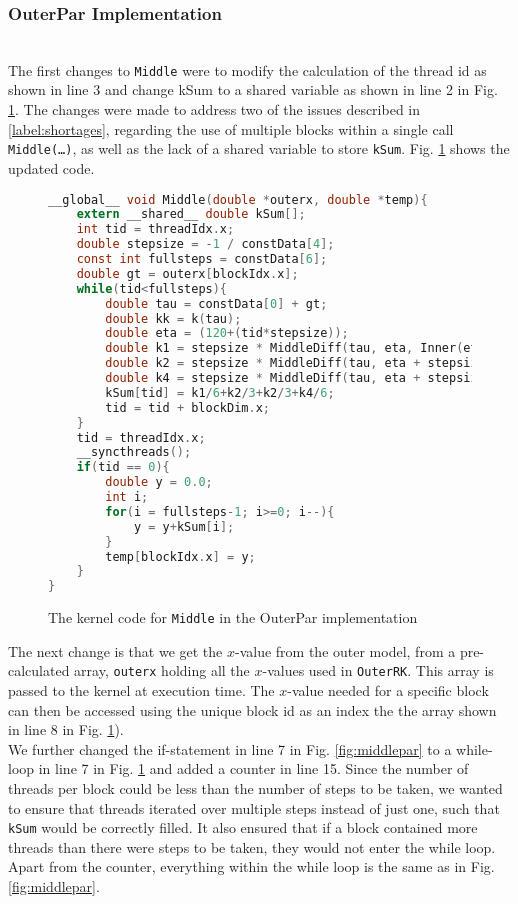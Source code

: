 \subsubsection{OuterPar Implementation} \hfill \\
The first changes to \texttt{Middle} were to modify the calculation of the thread id as shown in line 3 and change kSum to a shared variable as shown in line 2 in Fig. \ref{fig:outerpar}. The changes were made to address two of the issues described in \ref{label:shortages}, regarding the use of multiple blocks within a single call \texttt{Middle(…)}, as well as the lack of a shared variable to store \texttt{kSum}. Fig. \ref{fig:outerpar} shows the updated code.

\begin{figure}[ht]
\begin{lstlisting}[language=c]
__global__ void Middle(double *outerx, double *temp){
	extern __shared__ double kSum[];
	int tid = threadIdx.x;
	double stepsize = -1 / constData[4];
	const int fullsteps = constData[6];
	double gt = outerx[blockIdx.x];
	while(tid<fullsteps){
		double tau = constData[0] + gt;
		double kk = k(tau);
		double eta = (120+(tid*stepsize));
		double k1 = stepsize * MiddleDiff(tau, eta, Inner(eta, gt, kk).y);
		double k2 = stepsize * MiddleDiff(tau, eta + stepsize/2, Inner(eta + stepsize/2, gt, kk).y);		
		double k4 = stepsize * MiddleDiff(tau, eta + stepsize, Inner(eta + stepsize, gt, kk).y);
		kSum[tid] = k1/6+k2/3+k2/3+k4/6;
		tid = tid + blockDim.x;
	}
	tid = threadIdx.x;
	__syncthreads();
	if(tid == 0){
		double y = 0.0;
		int i;
		for(i = fullsteps-1; i>=0; i--){
			y = y+kSum[i];
		}
		temp[blockIdx.x] = y;
	}
}
\end{lstlisting}
\caption{The kernel code for \texttt{Middle} in the OuterPar implementation}
\label{fig:outerpar}
\end{figure}

The next change is that we get the $x$-value from the outer model, from a pre-calculated array, \texttt{outerx} holding all the $x$-values used in \texttt{OuterRK}. This array is passed to the kernel at execution time. The $x$-value needed for a specific block can then be accessed using the unique block id as an index the the array shown in line 8 in Fig. \ref{fig:outerpar}).\\

We further changed the if-statement in line 7 in Fig. \ref{fig:middlepar} to a while-loop in line 7 in Fig. \ref{fig:outerpar} and added a counter in line 15. Since the number of threads per block could be less than the number of steps to be taken, we wanted to ensure that threads iterated over multiple steps instead of just one, such that \texttt{kSum} would be correctly filled. It also ensured that if a block contained more threads than there were steps to be taken, they would not enter the while loop. Apart from the counter, everything within the while loop is the same as in Fig. \ref{fig:middlepar}.\\ \\

